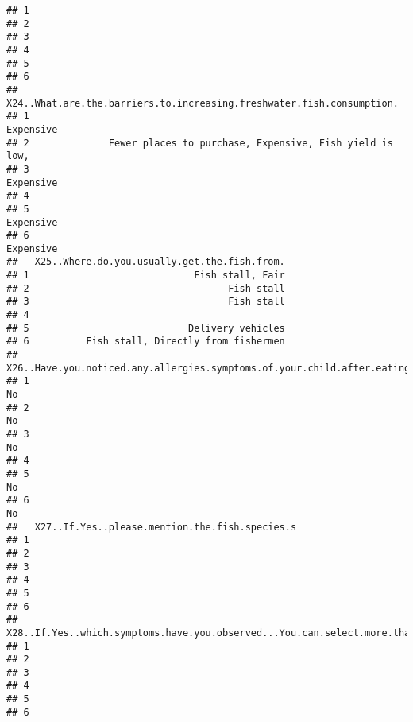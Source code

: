 \documentclass[
]{article}
\begin{document}
\begin{verbatim}
## 1                                                                                                               
## 2                                                                                                               
## 3                                                                                                               
## 4                                                                                                               
## 5                                                                                                               
## 6                                                                                                               
##   X24..What.are.the.barriers.to.increasing.freshwater.fish.consumption.
## 1                                                             Expensive
## 2              Fewer places to purchase, Expensive, Fish yield is low, 
## 3                                                             Expensive
## 4                                                                      
## 5                                                             Expensive
## 6                                                             Expensive
##   X25..Where.do.you.usually.get.the.fish.from.
## 1                             Fish stall, Fair
## 2                                   Fish stall
## 3                                   Fish stall
## 4                                             
## 5                            Delivery vehicles
## 6          Fish stall, Directly from fishermen
##   X26..Have.you.noticed.any.allergies.symptoms.of.your.child.after.eating.Freshwater.fish.
## 1                                                                                       No
## 2                                                                                       No
## 3                                                                                       No
## 4                                                                                         
## 5                                                                                       No
## 6                                                                                       No
##   X27..If.Yes..please.mention.the.fish.species.s
## 1                                               
## 2                                               
## 3                                               
## 4                                               
## 5                                               
## 6                                               
##   X28..If.Yes..which.symptoms.have.you.observed...You.can.select.more.than.one.option.
## 1                                                                                     
## 2                                                                                     
## 3                                                                                     
## 4                                                                                     
## 5                                                                                     
## 6
\end{verbatim}
\end{document}
